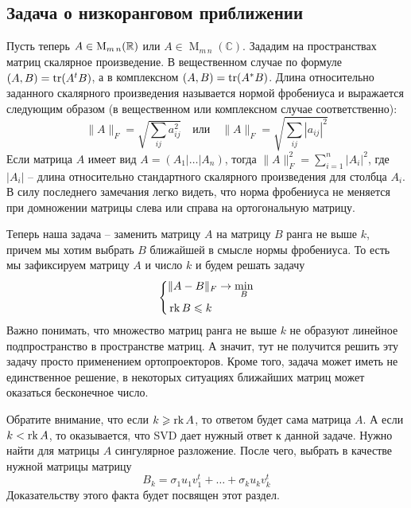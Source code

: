 \subsection{Задача о низкоранговом приближении}
\label{section::Approx}

Пусть теперь $A\in \operatorname{M}_{m\,n}(\mathbb R)$ или $A\in \operatorname{M}_{m\,n}(\mathbb C)$.
Зададим на пространствах матриц скалярное произведение.
В вещественном случае по формуле $(A, B) = \operatorname{tr}(A^t B)$, а в комплексном $(A, B) = \operatorname{tr}(A^*B)$.
Длина относительно заданного скалярного произведения называется нормой фробениуса и выражается следующим образом (в вещественном или комплексном случае соответственно):
\[
\|A\|_F = \sqrt{\sum_{ij}a_{ij}^2}
\quad\text{или}\quad
\|A\|_F = \sqrt{\sum_{ij}|a_{ij}|^2}
\]
Если матрица $A$ имеет вид $A = (A_1|\ldots|A_n)$, тогда $\|A\|_F^2 = \sum_{i=1}^n |A_i|^2$, где $|A_i|$ -- длина относительно стандартного скалярного произведения для столбца $A_i$.
В силу последнего замечания легко видеть, что норма фробениуса не меняется при домножении матрицы слева или справа на ортогональную матрицу.

Теперь наша задача -- заменить матрицу $A$ на матрицу $B$ ранга не выше $k$, причем мы хотим выбрать $B$ ближайшей в смысле нормы фробениуса.
То есть мы зафиксируем матрицу $A$ и число $k$ и будем решать задачу
\[
\left\{
\begin{aligned}
&\|A - B\|_F \to \min_B\\
&\operatorname{rk} B \leqslant k
\end{aligned}
\right.
\]
Важно понимать, что множество матриц ранга не выше $k$ не образуют линейное подпространство в пространстве матриц.
А значит, тут не получится решить эту задачу просто применением ортопроекторов.
Кроме того, задача может иметь не единственное решение, в некоторых ситуациях ближайших матриц может оказаться бесконечное число.

Обратите внимание, что если $k \geqslant \operatorname{rk} A$, то ответом будет сама матрица $A$.
А если $k < \operatorname{rk} A$, то оказывается, что SVD дает нужный ответ к данной задаче.
Нужно найти для матрицы $A$ сингулярное разложение.
После чего, выбрать в качестве нужной матрицы матрицу
\[
B_k = \sigma_1 u_1 v_1^t + \ldots + \sigma_k u_k v_k^t
\]
Доказательству этого факта будет посвящен этот раздел.

